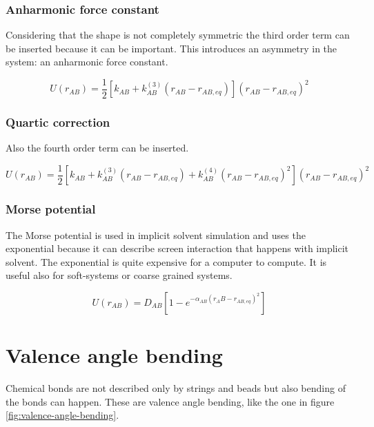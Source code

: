 		\subsubsection{Anharmonic force constant}
		Considering that the shape is not completely symmetric the third order term can be inserted because it can be important.
		This introduces an asymmetry in the system: an anharmonic force constant.

		$$U(r_{AB}) = \frac{1}{2}[k_{AB}+k^{(3)}_{AB}(r_{AB}-r_{AB, eq})](r_{AB}-r_{AB, eq})^2$$

		\subsubsection{Quartic correction}
		Also the fourth order term can be inserted.

		$$U(r_{AB}) = \frac{1}{2}[k_{AB}+k^{(3)}_{AB}(r_{AB}-r_{AB, eq}) + k^{(4)}_{AB}(r_{AB}-r_{AB,eq})^2](r_{AB}-r_{AB, eq})^2$$

		\subsubsection{Morse potential}
		The Morse potential is used in implicit solvent simulation and uses the exponential because it can describe screen interaction that happens with implicit solvent.
		The exponential is quite expensive for a computer to compute.
		It is useful also for soft-systems or coarse grained systems.

		$$U(r_{AB}) = D_{AB}[1-e^{-\alpha_{AB}(r_AB-r_{AB,eq})^2}]$$

\section{Valence angle bending}
Chemical bonds are not described only by strings and beads but also bending of the bonds can happen.
These are valence angle bending, like the one in figure \ref{fig:valence-angle-bending}.

